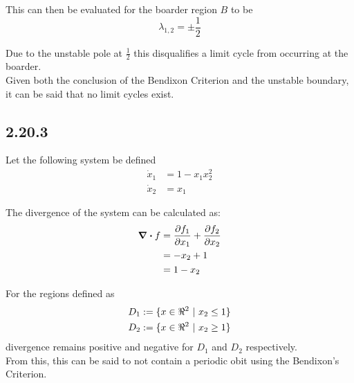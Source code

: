 \documentclass[letter]{article}
\begin{document}
This can then be evaluated for the boarder region $B$ to be
\begin{equation}
	\lambda_{1,2} = \pm \frac{1}{2}
\end{equation}

Due to the unstable pole at $\frac{1}{2}$ this disqualifies a limit cycle from occurring at the boarder.\\

Given both the conclusion of the Bendixon Criterion and the unstable boundary, it can be said that no limit cycles exist.


\newpage
\subsection{2.20.3}
Let the following system be defined
\begin{equation}
	\begin{aligned}
		\dot{x}_1 &= 1 - x_1 x_2^2\\
		\dot{x}_2 &= x_1
	\end{aligned}
\end{equation}


The divergence of the system can be calculated as:
\begin{align}
	\div f  &= \pdv{f_1}{x_1} + \pdv{f_2}{x_2} \nonumber\\
	&= -x_2 + 1\\
	&= 1 - x_2
\end{align}

For the regions defined as
\begin{equation}
	\begin{aligned}
		D_1 &:= \{x \in \real^2 \ | \ x_2 \leq 1\}\\
		D_2 &:= \{x \in \real^2 \ | \ x_2 \geq 1\}
	\end{aligned}
\end{equation}
divergence remains positive and negative for $D_1$ and $D_2$ respectively.\\

From this, this can be said to not contain a periodic obit using the Bendixon's Criterion.

%
%
\end{document}
